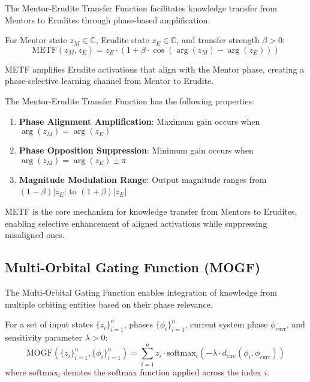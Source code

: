 The Mentor-Erudite Transfer Function facilitates knowledge transfer from Mentors to Erudites through phase-based amplification.

\begin{definition}
For Mentor state $z_M \in \mathbb{C}$, Erudite state $z_E \in \mathbb{C}$, and transfer strength $\beta > 0$:
\begin{equation}
\text{METF}(z_M, z_E) = z_E \cdot (1 + \beta \cdot \cos(\arg(z_M) - \arg(z_E)))
\end{equation}
\end{definition}

METF amplifies Erudite activations that align with the Mentor phase, creating a phase-selective learning channel from Mentor to Erudite.

\begin{proposition}
The Mentor-Erudite Transfer Function has the following properties:
\begin{enumerate}
    \item \textbf{Phase Alignment Amplification}: Maximum gain occurs when $\arg(z_M) = \arg(z_E)$
    \item \textbf{Phase Opposition Suppression}: Minimum gain occurs when $\arg(z_M) = \arg(z_E) \pm \pi$
    \item \textbf{Magnitude Modulation Range}: Output magnitude ranges from $(1-\beta)|z_E|$ to $(1+\beta)|z_E|$
\end{enumerate}
\end{proposition}

METF is the core mechanism for knowledge transfer from Mentors to Erudites, enabling selective enhancement of aligned activations while suppressing misaligned ones.

\subsection{Multi-Orbital Gating Function (MOGF)}

The Multi-Orbital Gating Function enables integration of knowledge from multiple orbiting entities based on their phase relevance.

\begin{definition}
For a set of input states $\{z_i\}_{i=1}^n$, phases $\{\phi_i\}_{i=1}^n$, current system phase $\phi_{\text{curr}}$, and sensitivity parameter $\lambda > 0$:
\begin{equation}
\text{MOGF}(\{z_i\}_{i=1}^n, \{\phi_i\}_{i=1}^n) = \sum_{i=1}^n z_i \cdot \text{softmax}_i(-\lambda \cdot d_{\text{circ}}(\phi_i, \phi_{\text{curr}}))
\end{equation}
where $\text{softmax}_i$ denotes the softmax function applied across the index $i$.
\end{definition}

